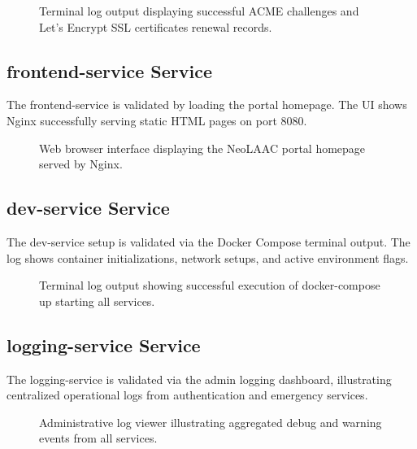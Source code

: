 \documentclass[12pt]{article}
\begin{document}
\begin{figure}[htbp]
    \centering
    \caption{Terminal log output displaying successful ACME challenges and Let's Encrypt SSL certificates renewal records.}
    \label{fig:ssl_status}
\end{figure}

\subsection{frontend-service Service}
The frontend-service is validated by loading the portal homepage. The UI shows Nginx successfully serving static HTML pages on port 8080.

\begin{figure}[htbp]
    \centering
    \caption{Web browser interface displaying the NeoLAAC portal homepage served by Nginx.}
    \label{fig:frontend_home}
\end{figure}

\subsection{dev-service Service}
The dev-service setup is validated via the Docker Compose terminal output. The log shows container initializations, network setups, and active environment flags.

\begin{figure}[htbp]
    \centering
    \caption{Terminal log output showing successful execution of docker-compose up starting all services.}
    \label{fig:docker_compose}
\end{figure}

\subsection{logging-service Service}
The logging-service is validated via the admin logging dashboard, illustrating centralized operational logs from authentication and emergency services.

\begin{figure}[htbp]
    \centering
    \caption{Administrative log viewer illustrating aggregated debug and warning events from all services.}
    \label{fig:logging_dashboard}
\end{figure}
\end{document}

